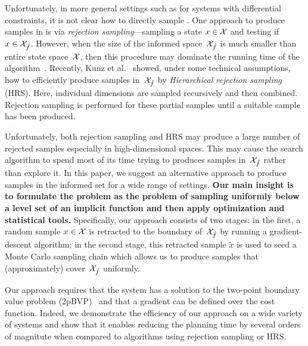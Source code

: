 \documentclass[letterpaper, 10 pt, conference]{ieeeconf}  %
\begin{document}
Unfortunately, in more general settings such as
for systems with differential constraints,
it is not clear how to directly sample \Cinf.
%
One approach to produce samples in \Cinf is via \emph{rejection sampling}---sampling a state $x \in \mathcal{X}$ and testing if $x \in \mathcal{X}_{\hat{f}}$.
However, when the size of the informed space~$\mathcal{X}_{\hat{f}}$ is much smaller than entire state space~$\mathcal{X}$, then this procedure may dominate the running time of the algorithm~\cite{KTC16}.
Recently, Kunz et al.~\cite{KTC16} showed, under some technical assumptions, how to efficiently produce samples in~$\mathcal{X}_{\hat{f}}$ by \emph{Hierarchical rejection sampling} (HRS). 
Here, individual dimensions are sampled recursively 
and then combined. Rejection sampling is performed for these partial samples until a suitable sample has been produced. 

Unfortunately, both rejection sampling and HRS may produce a large number of rejected samples especially in high-dimensional spaces.
This may cause the search algorithm to spend most of its time trying to produces samples in~$\mathcal{X}_{\hat{f}}$ rather than explore it.
In this paper, we suggest an alternative approach to produce samples in the informed set \Cinf for a wide range of settings.
\textbf{Our main insight is to formulate the problem as the problem of sampling uniformly below a level set of an implicit function and then apply optimization and statistical tools.}
Specifically, our approach consists of two stages:
in the first, a random sample $x \in \mathcal{X}$ is retracted to the boundary of~$\mathcal{X}_{\hat{f}}$ by running a gradient-descent algorithm;
in the second stage, this retracted sample $\tilde{x}$ is used to seed a Monte Carlo sampling chain which allows us to  produce samples that (approximately) cover~$\mathcal{X}_{\hat{f}}$  uniformly.

Our approach requires that the system has a solution to the two-point boundary value problem (2pBVP)~\cite{L06, H02} and that a gradient can be defined over the cost function.
Indeed, we demonstrate the efficiency of our approach on a wide variety of systems and show that it enables reducing the planning time by several orders of magnitute when compared to algorithms using rejection sampling or HRS.

%
\end{document}
